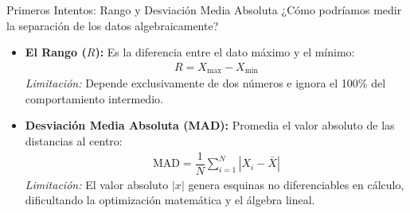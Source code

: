 \documentclass[10pt,aspectratio=169]{beamer}
\begin{document}
\begin{frame}{Primeros Intentos: Rango y Desviación Media Absoluta}
  ¿Cómo podríamos medir la separación de los datos algebraicamente? \pause
  \begin{itemize}
    \item \textbf{El Rango ($R$):} Es la diferencia entre el dato máximo y el mínimo:
      \begin{align}
        R = X_{\max} - X_{\min}
      \end{align}
      \small \emph{Limitación:} Depende exclusivamente de dos números e ignora el 100\% del comportamiento intermedio. \pause
    \item \textbf{Desviación Media Absoluta (MAD):} Promedia el valor absoluto de las distancias al centro:
      \begin{align}
        \text{MAD} = \dfrac{1}{N} \sum_{i=1}^{N} |X_i - \bar{X}|
      \end{align}
      \small \emph{Limitación:} El valor absoluto $|x|$ genera esquinas no diferenciables en cálculo, dificultando la optimización matemática y el álgebra lineal.
  \end{itemize}
\end{frame}
\end{document}
